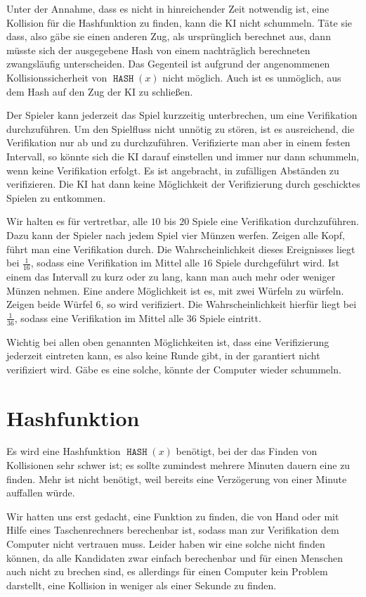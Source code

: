 \documentclass{scrartcl}
\newcommand{\dice}[1]{\ensuremath{#1}}
\DeclareMathOperator{\hash}{\texttt{HASH}}
\begin{document}
Unter der Annahme, dass es nicht in hinreichender Zeit notwendig ist, eine
Kollision für die Hashfunktion zu finden, kann die KI nicht schummeln.  Täte sie
dass, also gäbe sie einen anderen Zug, als ursprünglich berechnet aus, dann
müsste sich der ausgegebene Hash von einem nachträglich berechneten zwangsläufig
unterscheiden. Das Gegenteil ist aufgrund der angenommenen Kollisionssicherheit
von $\hash(x)$ nicht möglich.  Auch ist es unmöglich, aus dem Hash auf den Zug
der KI zu schließen.

Der Spieler kann jederzeit das Spiel kurzzeitig unterbrechen, um eine
Verifikation durchzuführen. Um den Spielfluss nicht unnötig zu stören, ist es
ausreichend, die Verifikation nur ab und zu durchzuführen.  Verifizierte man
aber in einem festen Intervall, so könnte sich die KI darauf einstellen und
immer nur dann schummeln, wenn keine Verifikation erfolgt. Es ist angebracht,
in zufälligen Abständen zu verifizieren. Die KI hat dann keine Möglichkeit der
Verifizierung durch geschicktes Spielen zu entkommen.

Wir halten es für vertretbar, alle $10$ bis $20$ Spiele eine Verifikation
durchzuführen. Dazu kann der Spieler nach jedem Spiel vier Münzen werfen. Zeigen
alle Kopf, führt man eine Verifikation durch. Die Wahrscheinlichkeit dieses
Ereignisses liegt bei $\frac1{16}$, sodass eine Verifikation im Mittel alle $16$
Spiele durchgeführt wird. Ist einem das Intervall zu kurz oder zu lang, kann man
auch mehr oder weniger Münzen nehmen. Eine andere Möglichkeit ist es, mit zwei
Würfeln zu würfeln. Zeigen beide Würfel \dice{6}, so wird verifiziert.  Die
Wahrscheinlichkeit hierfür liegt bei $\frac1{36}$, sodass eine Verifikation im
Mittel alle $36$ Spiele eintritt.

Wichtig bei allen oben genannten Möglichkeiten ist, dass eine Verifizierung
jederzeit eintreten kann, es also keine Runde gibt, in der garantiert nicht
verifiziert wird. Gäbe es eine solche, könnte der Computer wieder schummeln.

\section{Hashfunktion}
Es wird eine Hashfunktion $\hash(x)$ benötigt, bei der das Finden von
Kollisionen sehr schwer ist; es sollte zumindest mehrere Minuten dauern eine zu
finden. Mehr ist nicht benötigt, weil bereits eine Verzögerung von einer Minute
auffallen würde.

Wir hatten uns erst gedacht, eine Funktion zu finden, die von Hand oder mit
Hilfe eines Taschenrechners berechenbar ist, sodass man zur Verifikation dem
Computer nicht vertrauen muss. Leider haben wir eine solche nicht finden können,
da alle Kandidaten zwar einfach berechenbar und für einen Menschen auch nicht zu
brechen sind, es allerdings für einen Computer kein Problem darstellt, eine
Kollision in weniger als einer Sekunde zu finden.
\end{document}
